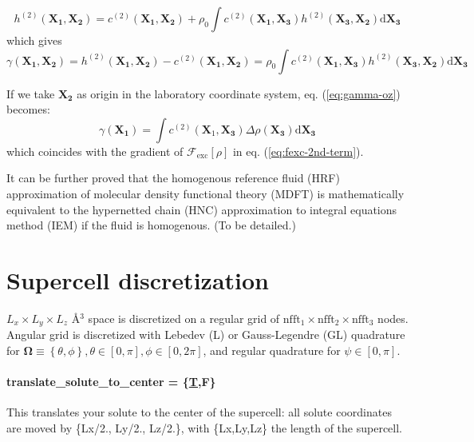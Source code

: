 \begin{equation}
h^{(2)}(\mathbf{X_{1}},\mathbf{X_{2}})=c^{(2)}(\mathbf{X_{1}},\mathbf{X_{2}})+\rho_{0}\int c^{(2)}(\mathbf{X_{1}},\mathbf{X_{3}})h^{(2)}(\mathbf{X_{3}},\mathbf{X_{2}})\mathrm{d}\mathbf{X_{3}}\label{eq:oz-iem-1}
\end{equation}
which gives 
\begin{equation}
\gamma(\mathbf{X_{1}},\mathbf{X_{2}})=h^{(2)}(\mathbf{X_{1}},\mathbf{X_{2}})-c^{(2)}(\mathbf{X_{1}},\mathbf{X_{2}})=\rho_{0}\int c^{(2)}(\mathbf{X_{1}},\mathbf{X_{3}})h^{(2)}(\mathbf{X_{3}},\mathbf{X_{2}})\mathrm{d}\mathbf{X_{3}}\label{eq:gamma-oz}
\end{equation}


If we take $\mathbf{X_{2}}$ as origin in the laboratory coordinate
system, eq. (\ref{eq:gamma-oz}) becomes:
\begin{equation}
\gamma(\mathbf{X_{1}})=\int c^{(2)}(\mathbf{X}_{1},\mathbf{X_{3}})\Delta\rho(\mathbf{X_{3}})\mathrm{d}\mathbf{X_{3}}\label{eq:gamma-oz-1}
\end{equation}
which coincides with the gradient of $\mathcal{F}_{\mathrm{exc}}\left[\rho\right]$
in eq. (\ref{eq:fexc-2nd-term}).

It can be further proved that the homogenous reference fluid (HRF)
approximation of molecular density functional theory (MDFT) is mathematically
equivalent to the hypernetted chain (HNC) approximation to integral
equations method (IEM) if the fluid is homogenous. (To be detailed.)


\section{Supercell discretization}

$L_{x}\times L_{y}\times L_{z}$ Å$^{3}$ space is discretized on
a regular grid of $\textrm{nfft}_{1}\times\textrm{nfft}_{2}\times\textrm{nfft}_{3}$
nodes. Angular grid is discretized with Lebedev (L) or Gauss-Legendre
(GL) quadrature for $\bm{\Omega}\equiv\left\{ \theta,\phi\right\} ,\theta\in\left[0,\pi\right],\phi\in\left[0,2\pi\right]$,
and regular quadrature for $\psi\in\left[0,\pi\right]$.


\paragraph{translate\_solute\_to\_center = \{\uline{T},F\}\protect \\
}

This translates your solute to the center of the supercell: all solute
coordinates are moved by \{Lx/2., Ly/2., Lz/2.\}, with \{Lx,Ly,Lz\}
the length of the supercell.


